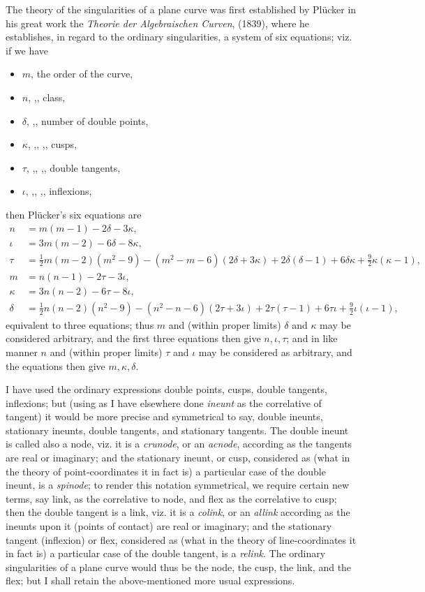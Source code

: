 \documentclass[11pt]{article}
\begin{document}
The theory of the singularities of a plane curve was first established by Pl\"ucker in his great work the \emph{Theorie der Algebraischen Curven}, (1839), where he establishes, in regard to the ordinary singularities, a system of six equations; viz. if we have
\begin{itemize}\setlength{\itemsep}{0pt}
\item[] $m$, the order of the curve,
\item[] $n$, ,, class,
\item[] $\delta$, ,, number of double points,
\item[] $\kappa$, ,, ,, cusps,
\item[] $\tau$, ,, ,, double tangents,
\item[] $\iota$, ,, ,, inflexions,
\end{itemize}
then Pl\"ucker's six equations are
\begin{align*}
n &= m(m-1) - 2\delta - 3\kappa,\\
\iota &= 3m(m-2) - 6\delta - 8\kappa,\\
\tau &= \tfrac{1}{2}m(m-2)(m^2 - 9) - (m^2 - m - 6)(2\delta + 3\kappa) + 2\delta(\delta - 1) + 6\delta\kappa + \tfrac{9}{2}\kappa(\kappa - 1),\\
m &= n(n-1) - 2\tau - 3\iota,\\
\kappa &= 3n(n-2) - 6\tau - 8\iota,\\
\delta &= \tfrac{1}{2}n(n-2)(n^2 - 9) - (n^2 - n - 6)(2\tau + 3\iota) + 2\tau(\tau - 1) + 6\tau\iota + \tfrac{9}{2}\iota(\iota - 1),
\end{align*}
equivalent to three equations; thus $m$ and (within proper limits) $\delta$ and $\kappa$ may be considered arbitrary, and the first three equations then give $n, \iota, \tau$; and in like manner $n$ and (within proper limits) $\tau$ and $\iota$ may be considered as arbitrary, and the equations then give $m, \kappa, \delta$.

I have used the ordinary expressions double points, cusps, double tangents, inflexions; but (using as I have elsewhere done \emph{ineunt} as the correlative of tangent) it would be more precise and symmetrical to say, double ineunts, stationary ineunts, double tangents, and stationary tangents. The double ineunt is called also a node, viz. it is a \emph{crunode}, or an \emph{acnode}, according as the tangents are real or imaginary; and the stationary ineunt, or cusp, considered as (what in the theory of point-coordinates it in fact is) a particular case of the double ineunt, is a \emph{spinode}; to render this notation symmetrical, we require certain new terms, say link, as the correlative to node, and flex as the correlative to cusp; then the double tangent is a link, viz. it is a \emph{colink}, or an \emph{allink} according as the ineunts upon it (points of contact) are real or imaginary; and the stationary tangent (inflexion) or flex, considered as (what in the theory of line-coordinates it in fact is) a particular case of the double tangent, is a \emph{relink}. The ordinary singularities of a plane curve would thus be the node, the cusp, the link, and the flex; but I shall retain the above-mentioned more usual expressions.
\end{document}
